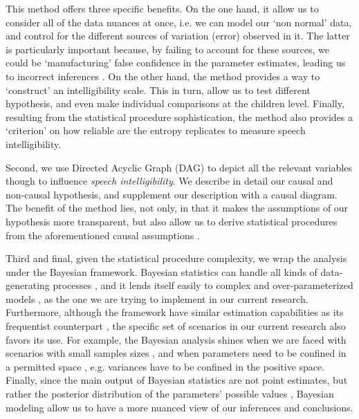 This method offers three specific benefits. On the one hand, it allow us to consider all of the data nuances at once, i.e. we can model our `non normal' data, and control for the different sources of variation (error) observed in it. The latter is particularly important because, by failing to account for these sources, we could be `manufacturing' false confidence in the parameter estimates, leading us to incorrect inferences \cite{McElreath_2020}. On the other hand, the method provides a way to `construct' an intelligibility scale. This in turn, allow us to test different hypothesis, and even make individual comparisons at the children level. Finally, resulting from the statistical procedure sophistication, the method also provides a `criterion' on how reliable are the entropy replicates to measure speech intelligibility.

Second, we use Directed Acyclic Graph (DAG) \cite{Pearl_2009, Cinelli_et_al_2021} to depict all the relevant variables though to influence \textit{speech intelligibility}. We describe in detail our causal and non-causal hypothesis, and supplement our description with a causal diagram. The benefit of the method lies, not only, in that it makes the assumptions of our hypothesis more transparent, but also allow us to derive statistical procedures from the aforementioned causal assumptions \cite{McElreath_2020, Yarkoni_2020, Rohrer_et_al_2021}.

Third and final, given the statistical procedure complexity, we wrap the analysis under the Bayesian framework. Bayesian statistics can handle all kinds of data-generating processes \cite{Fox_2010}, and it lends itself easily to complex and over-parameterized models \cite{Baker_1998, Kim_1999}, as the one we are trying to implement in our current research. Furthermore, although the framework have similar estimation capabilities as its frequentist counterpart \cite{Baker_1998, Hsieh_2010, Wollack_2002}, the specific set of scenarios in our current research also favors its use. For example, the Bayesian analysis shines when we are faced with scenarios with small samples sizes \cite{Fox_2010, McElreath_2020, Skrondal_et_al_2004a}, and when parameters need to be confined in a permitted space \cite{Martin_et_al_1975}, e.g. variances have to be confined in the positive space. Finally, since the main output of Bayesian statistics are not point estimates, but rather the posterior distribution of the parameters' possible values \cite{McElreath_2020}, Bayesian modeling allow us to have a more nuanced view of our inferences and conclusions.

